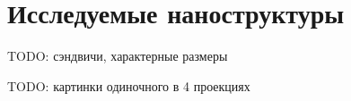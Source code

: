 \section{Исследуемые наноструктуры}

TODO: сэндвичи, характерные размеры

TODO: картинки одиночного в 4 проекциях